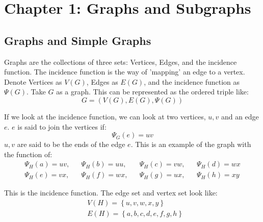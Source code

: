 \documentclass{article}
\begin{document}
\section{Chapter 1: Graphs and Subgraphs}
\subsection{Graphs and Simple Graphs}

\indent{} Graphs are the collections of three sets: Vertices, Edges, and the incidence function. The incidence function is the way of 'mapping' an edge to a vertex.
Denote Vertices as $V(G)$, Edges as $E(G)$, and the incidence function as $\Psi(G)$.
\newline
Take $G$ as a graph. This can be represented as the ordered triple like:
\[G = (V(G), E(G), \Psi(G))\]

If we look at the incidence function, we can look at two vertices, $u,v$ and an edge $e$. $e$ is said to join the vertices if:
\[\Psi_G(e) = uv \] 
\indent{} $u,v$ are said to be the ends of the edge $e$. This is an example of the graph with the function of:
\begin{align*}
    \Psi_H(a) = uv, && \Psi_H(b) = uu, && \Psi_H(c) = vw, && \Psi_H(d) = wx\\
    \Psi_H(e) = vx, && \Psi_H(f) = wx, && \Psi_H(g) = ux, && \Psi_H(h) = xy
\end{align*}

This is the incidence function. The edge set and vertex set look like:
\begin{align*}
    &V(H) = \left\{u,v,w,x,y\right\}\\
    &E(H) = \left\{a,b,c,d,e,f,g,h\right\}
\end{align*}

\begin{figure}[ht]
    \centering
    
    \caption{}
\end{figure}
\end{document}
